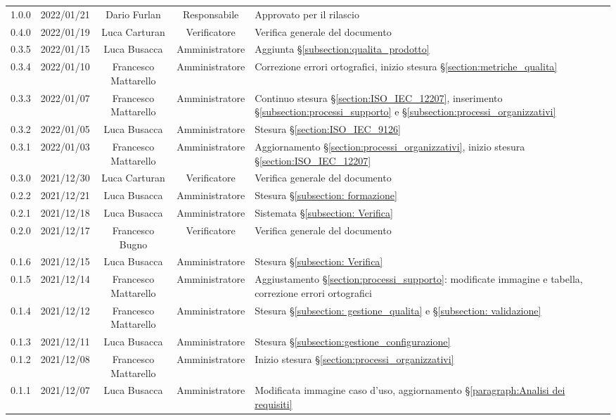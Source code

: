 \begin{center}
\begin{longtable}[c]{c | c | c | c | p{5cm}}
		1.0.0 & 2022/01/21 & Dario Furlan & Responsabile & Approvato per il rilascio \\
		0.4.0 & 2022/01/19 & Luca Carturan & Verificatore & Verifica generale del documento \\
		0.3.5 & 2022/01/15 & Luca Busacca & Amministratore & Aggiunta §\ref{subsection:qualita_prodotto} \\
		0.3.4 & 2022/01/10 & Francesco Mattarello & Amministratore & Correzione errori ortografici, inizio stesura §\ref{section:metriche_qualita} \\
		0.3.3 & 2022/01/07 & Francesco Mattarello & Amministratore & Continuo stesura §\ref{section:ISO_IEC_12207}, inserimento §\ref{subsection:processi_supporto} e §\ref{subsection:processi_organizzativi} \\
		0.3.2 & 2022/01/05 & Luca Busacca         & Amministratore & Stesura §\ref{section:ISO_IEC_9126} \\
		0.3.1 & 2022/01/03 & Francesco Mattarello & Amministratore & Aggiornamento §\ref{section:processi_organizzativi}, inizio stesura §\ref{section:ISO_IEC_12207} \\
		0.3.0 & 2021/12/30 & Luca Carturan        & Verificatore   & Verifica generale del documento \\
		0.2.2 & 2021/12/21 & Luca Busacca         & Amministratore & Stesura §\ref{subsection: formazione} \\
		0.2.1 & 2021/12/18 & Luca Busacca         & Amministratore & Sistemata §\ref{subsection: Verifica} \\
		0.2.0 & 2021/12/17 & Francesco Bugno      & Verificatore   & Verifica generale del documento \\
		0.1.6 & 2021/12/15 & Luca Busacca         & Amministratore & Stesura §\ref{subsection: Verifica} \\
		0.1.5 & 2021/12/14 & Francesco Mattarello & Amministratore & Aggiustamento §\ref{section:processi_supporto}: modificate immagine e tabella, correzione errori ortografici \\
		0.1.4 & 2021/12/12 & Francesco Mattarello & Amministratore & Stesura §\ref{subsection: gestione_qualita} e §\ref{subsection: validazione} \\
		0.1.3 & 2021/12/11 & Luca Busacca         & Amministratore & Stesura  §\ref{subsection:gestione_configurazione} \\
		0.1.2 & 2021/12/08 & Francesco Mattarello & Amministratore & Inizio stesura §\ref{section:processi_organizzativi} \\
		0.1.1 & 2021/12/07 & Luca Busacca         & Amministratore & Modificata immagine caso d'uso, aggiornamento §\ref{paragraph:Analisi dei requisiti} \\

\end{longtable}
\end{center}
